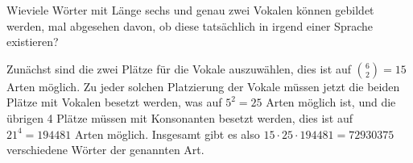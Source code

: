 Wieviele Wörter mit Länge sechs und genau zwei Vokalen können
gebildet werden,
mal abgesehen davon, ob diese tatsächlich in irgend einer Sprache
existieren?


\begin{loesung}
Zunächst sind die zwei Plätze für die Vokale auszuwählen, dies
ist auf $\binom{6}{2}=15$ Arten möglich. Zu jeder solchen Platzierung
der Vokale müssen jetzt die beiden Plätze mit Vokalen besetzt
werden, was auf $5^2=25$ Arten möglich ist, und die übrigen 4 Plätze
müssen mit Konsonanten besetzt werden, dies ist auf $21^4=194481$
Arten möglich.
Insgesamt gibt es also $15\cdot 25\cdot 194481=72930375$
verschiedene Wörter der genannten Art.
\end{loesung}

